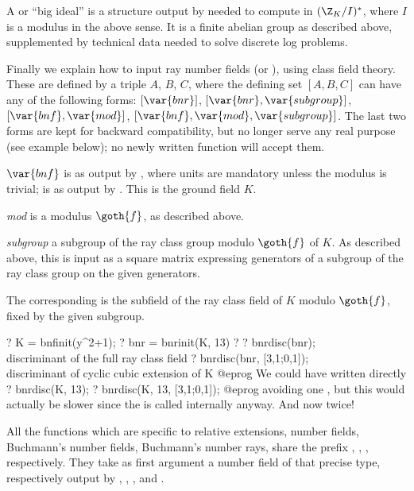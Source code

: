 A  or ``big ideal'' is a structure output by 
needed to compute in $(\Z_K/I)^*$, where $I$ is a modulus in the above sense.
It is a finite abelian group as described above, supplemented by
technical data needed to solve discrete log problems.

Finally we explain how to input ray number fields (or ), using class
field theory. These are defined by a triple $A$, $B$, $C$, where the
defining set $[A,B,C]$ can have any of the following forms: $[\var{bnr}]$,
$[\var{bnr},\var{subgroup}]$, $[\var{bnf},\var{mod}]$,
$[\var{bnf},\var{mod},\var{subgroup}]$. The last two forms are kept for
backward compatibility, but no longer serve any real purpose (see example
below); no newly written function will accept them.

\item $\var{bnf}$ is as output by , where units are mandatory
unless the modulus is trivial;  is as output by . This
is the ground field $K$.

\item \emph{mod} is a modulus $\goth{f}$, as described above.

\item \emph{subgroup} a subgroup of the ray class group modulo $\goth{f}$ of
$K$. As described above, this is input as a square matrix expressing
generators of a subgroup of the ray class group  on the
given generators.

The corresponding  is the subfield of the ray class field of $K$
modulo $\goth{f}$, fixed by the given subgroup.

\bprog
  ? K = bnfinit(y^2+1);
  ? bnr = bnrinit(K, 13)
  ? %
  ? bnrdisc(bnr); \\ discriminant of the full ray class field
  ? bnrdisc(bnr, [3,1;0,1]); \\ discriminant of cyclic cubic extension of K
@eprog\noindent
We could have written directly
\bprog
  ? bnrdisc(K, 13);
  ? bnrdisc(K, 13, [3,1;0,1]);
@eprog\noindent
avoiding one , but this would actually be slower since the
 is called internally anyway. And now twice!


All the functions which are specific to relative extensions, number fields,
Buchmann's number fields, Buchmann's number rays, share the prefix ,
, ,  respectively. They take as first argument a
number field of that precise type, respectively output by ,
, , and .

